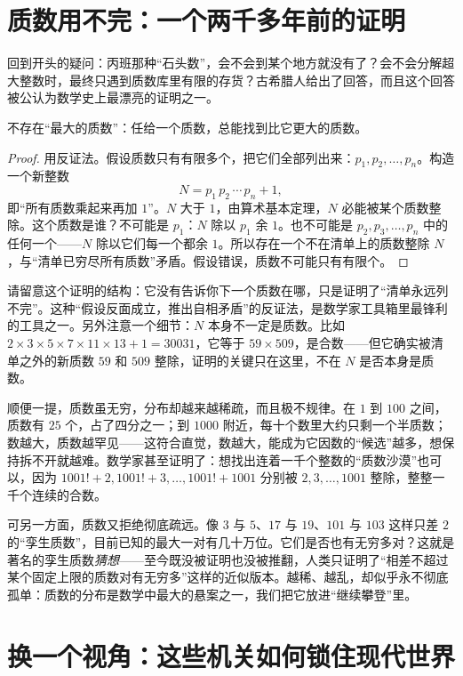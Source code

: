 \section{质数用不完：一个两千多年前的证明}

回到开头的疑问：丙班那种“石头数”，会不会到某个地方就没有了？会不会分解超大整数时，最终只遇到质数库里有限的存货？古希腊人给出了回答，而且这个回答被公认为数学史上最漂亮的证明之一。

\begin{dingli}[质数有无穷多个]
不存在“最大的质数”：任给一个质数，总能找到比它更大的质数。
\end{dingli}

\begin{proof}
用反证法。假设质数只有有限多个，把它们全部列出来：$p_1,p_2,\dots,p_n$。构造一个新整数
\[
N=p_1\,p_2\,\cdots\,p_n+1,
\]
即“所有质数乘起来再加 $1$”。$N$ 大于 $1$，由算术基本定理，$N$ 必能被某个质数整除。这个质数是谁？不可能是 $p_1$：$N$ 除以 $p_1$ 余 $1$。也不可能是 $p_2,p_3,\dots,p_n$ 中的任何一个——$N$ 除以它们每一个都余 $1$。所以存在一个不在清单上的质数整除 $N$，与“清单已穷尽所有质数”矛盾。假设错误，质数不可能只有有限个。
\end{proof}

请留意这个证明的结构：它没有告诉你下一个质数在哪，只是证明了“清单永远列不完”。这种“假设反面成立，推出自相矛盾”的反证法，是数学家工具箱里最锋利的工具之一。另外注意一个细节：$N$ 本身不一定是质数。比如 $2\times3\times5\times7\times11\times13+1=30031$，它等于 $59\times509$，是合数——但它确实被清单之外的新质数 $59$ 和 $509$ 整除，证明的关键只在这里，不在 $N$ 是否本身是质数。

顺便一提，质数虽无穷，分布却越来越稀疏，而且极不规律。在 $1$ 到 $100$ 之间，质数有 $25$ 个，占了四分之一；到 $1000$ 附近，每十个数里大约只剩一个半质数；数越大，质数越罕见——这符合直觉，数越大，能成为它因数的“候选”越多，想保持拆不开就越难。数学家甚至证明了：想找出连着一千个整数的“质数沙漠”也可以，因为 $1001!+2,1001!+3,\dots,1001!+1001$ 分别被 $2,3,\dots,1001$ 整除，整整一千个连续的合数。

可另一方面，质数又拒绝彻底疏远。像 $3$ 与 $5$、$17$ 与 $19$、$101$ 与 $103$ 这样只差 $2$ 的“孪生质数”，目前已知的最大一对有几十万位。它们是否也有无穷多对？这就是著名的孪生质数\emph{猜想}——至今既没被证明也没被推翻，人类只证明了“相差不超过某个固定上限的质数对有无穷多”这样的近似版本。越稀、越乱，却似乎永不彻底孤单：质数的分布是数学中最大的悬案之一，我们把它放进“继续攀登”里。

\section{换一个视角：这些机关如何锁住现代世界}

